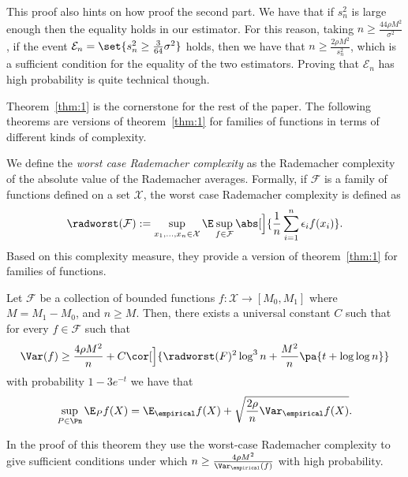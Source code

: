 This proof also hints on how proof the second part. We have that if $s^2_n$ is large enough then the equality holds in our estimator. For this reason, taking $n \geq \frac{44\rho M^2}{\sigma^2}$, if the event $\mathcal{E}_n = \set{s^2_n \geq \frac{3}{64}\sigma^2}$ holds, then we have that $n\geq \frac{2\rho M^2}{s^2_n}$, which is a sufficient condition for the equality of the two estimators. Proving that $\mathcal{E}_n$ has high probability is quite technical though.

Theorem~\ref{thm:1} is the cornerstone for the rest of the paper. The following theorems are versions of theorem~\ref{thm:1} for families of functions in terms of different kinds of complexity.

We define the \emph{worst case Rademacher complexity} as the Rademacher complexity of the absolute value of the Rademacher averages. Formally, if $\mathcal{F}$ is a family of functions defined on a set $\mathcal{X}$, the worst case Rademacher complexity is defined as
\[
    \radworst(\mathcal{F}) := \sup_{x_1, \dots, x_n \in \mathcal{X}} \E \sup_{f \in \mathcal{F}} \abs[\Big]{\frac{1}{n} \sum_{i=1}^n \epsilon_i f(x_i)}.
\]
Based on this complexity measure, they provide a version of theorem~\ref{thm:1} for families of functions.
\begin{theorem}\label{thm:2}
    Let $\mathcal{F}$ be a collection of bounded functions $f\colon \mathcal{X} \to [M_0, M_1]$ where $M = M_1 - M_0$, and $n \geq M$. Then, there exists a universal constant $C$ such that for every $f \in \mathcal{F}$ such that
    \[
    \Var(f) \geq \frac{4\rho M^2}{n} + C \cor[\Big]{\radworst(F)^2 \log^3 n  + \frac{M^2}{n}\pa{t + \log\log n}}
    \]
    with probability $1 - 3e^{-t}$ we have that
    \[
        \sup_{P \in\Pn}\E_P f(X) = \E_{\empirical} f(X) + \sqrt{\frac{2\rho}{n}\Var_{\empirical} f(X)}.
    \]
\end{theorem}
In the proof of this theorem they use the worst-case Rademacher complexity to give sufficient conditions under which $n \geq \frac{4\rho M^2}{\Var_{\empirical}(f)}$ with high probability.

